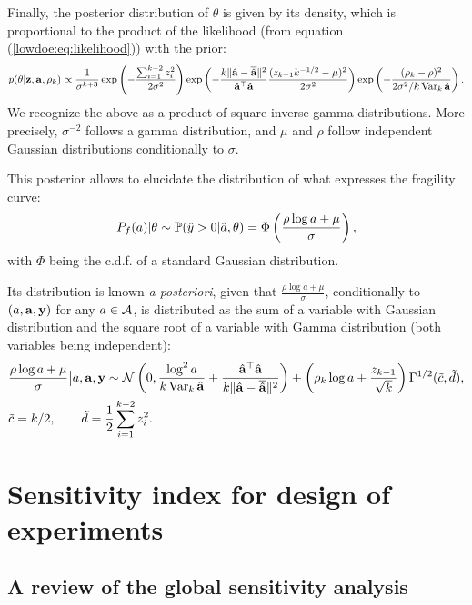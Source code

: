 Finally, the posterior distribution of $\theta$ is given by its density, which is proportional to the product of the likelihood (from equation (\ref{lowdoe:eq:likelihood})) with the prior:
    \begin{equation}\label{lowdoe:eq:posterior}
        p(\theta|\mathbf{z}, \mathbf{a},\rho_k) \propto \frac{1}{\sigma^{k+3}} \exp\left({-\frac{\sum_{i=1}^{k-2}z_i^2}{2\sigma^2}}\right) \exp\left({-\frac{k\|\hat{\mathbf{a}}-\overline{\hat{\mathbf{a}}}\|^2}{\hat{\mathbf{a}}^{\top}\hat{\mathbf{a}}}\frac{(z_{k-1}k^{-1/2}-\mu)^2}{2\sigma^2}}\right)
            \exp\left({-\frac{(\rho_k-\rho)^2}{2\sigma^2/k\operatorname{Var}_k\hat{\mathbf{a}}}}\right).
    \end{equation}
We recognize the above as a product of square inverse gamma distributions. More precisely, $\sigma^{-2}$ follows a gamma distribution, and $\mu$ and $\rho$ follow independent Gaussian distributions conditionally to $\sigma$.

This posterior allows to elucidate the distribution of what expresses the fragility curve: 
\begin{equation}
    P_f(a)|\theta \sim \mathbb{P}( \hat y>0|\hat a,\theta) = \Phi\left(\frac{\rho\log a+\mu}{\sigma}\right) ,
\end{equation}
with $\Phi$ being the c.d.f. of a standard Gaussian distribution.

Its distribution is known \emph{a posteriori}, given that
$\frac{\rho\log a+\mu}{\sigma}$, conditionally to $(a,\mathbf{a},\mathbf{y})$ for any $a\in\mathcal{A}$, is distributed as the sum
of a variable with Gaussian distribution and the square root of a variable with Gamma distribution (both variables being independent):
\begin{align}
    &\frac{\rho\log a+\mu}{\sigma}\big| a,\mathbf{a},\mathbf{y} \sim \mathcal{N}\left(0,\frac{\log^2 a}{k\operatorname{Var}_k\hat{\mathbf{a}}} + \frac{\hat{\mathbf{a}}^{\top}\hat{\mathbf{a}}}{k\|\hat{\mathbf{a}} -\overline{\hat{\mathbf{a}}}\|^2} \right) + \left(\rho_k\log a + \frac{z_{k-1}}{\sqrt{k}}\right)\Gamma^{1/2}(\tilde c,\tilde d) \label{lowdoe:eq:apostcf} , \\
    &\tilde c = k/2, \qquad \tilde d = \frac{1}{2}\sum_{i=1}^{k-2}z_i^2.
\end{align}



\section{Sensitivity index for design of experiments}\label{lowdoe:sec:PE}

\subsection{A review of the global sensitivity analysis}

